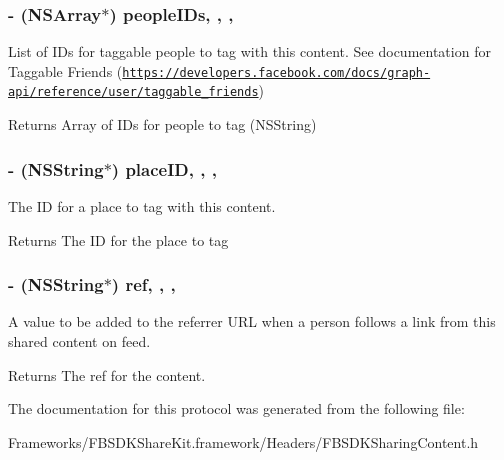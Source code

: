 \subsubsection[{people\+I\+Ds}]{\setlength{\rightskip}{0pt plus 5cm}-\/ (N\+S\+Array$\ast$) people\+I\+Ds\hspace{0.3cm}{\ttfamily [read]}, {\ttfamily [write]}, {\ttfamily [nonatomic]}, {\ttfamily [copy]}}\label{protocol_f_b_s_d_k_sharing_content-p_a07031f755deb87e88a8c0765c9d6651d}
List of I\+Ds for taggable people to tag with this content.  See documentation for Taggable Friends (\href{https://developers.facebook.com/docs/graph-api/reference/user/taggable_friends}{\tt https\+://developers.\+facebook.\+com/docs/graph-\/api/reference/user/taggable\+\_\+friends}) \begin{DoxyReturn}{Returns}
Array of I\+Ds for people to tag (N\+S\+String) 
\end{DoxyReturn}
\hypertarget{protocol_f_b_s_d_k_sharing_content-p_a8af542b311e24d38c73221d81d250399}{}
\subsubsection[{place\+I\+D}]{\setlength{\rightskip}{0pt plus 5cm}-\/ (N\+S\+String$\ast$) place\+I\+D\hspace{0.3cm}{\ttfamily [read]}, {\ttfamily [write]}, {\ttfamily [nonatomic]}, {\ttfamily [copy]}}\label{protocol_f_b_s_d_k_sharing_content-p_a8af542b311e24d38c73221d81d250399}
The I\+D for a place to tag with this content. \begin{DoxyReturn}{Returns}
The I\+D for the place to tag 
\end{DoxyReturn}
\hypertarget{protocol_f_b_s_d_k_sharing_content-p_a5ea294c3c5b2fd923d00ea95fc19a20d}{}
\subsubsection[{ref}]{\setlength{\rightskip}{0pt plus 5cm}-\/ (N\+S\+String$\ast$) ref\hspace{0.3cm}{\ttfamily [read]}, {\ttfamily [write]}, {\ttfamily [nonatomic]}, {\ttfamily [copy]}}\label{protocol_f_b_s_d_k_sharing_content-p_a5ea294c3c5b2fd923d00ea95fc19a20d}
A value to be added to the referrer U\+R\+L when a person follows a link from this shared content on feed. \begin{DoxyReturn}{Returns}
The ref for the content. 
\end{DoxyReturn}


The documentation for this protocol was generated from the following file\+:\begin{DoxyCompactItemize}
\item 
Frameworks/\+F\+B\+S\+D\+K\+Share\+Kit.\+framework/\+Headers/F\+B\+S\+D\+K\+Sharing\+Content.\+h\end{DoxyCompactItemize}
